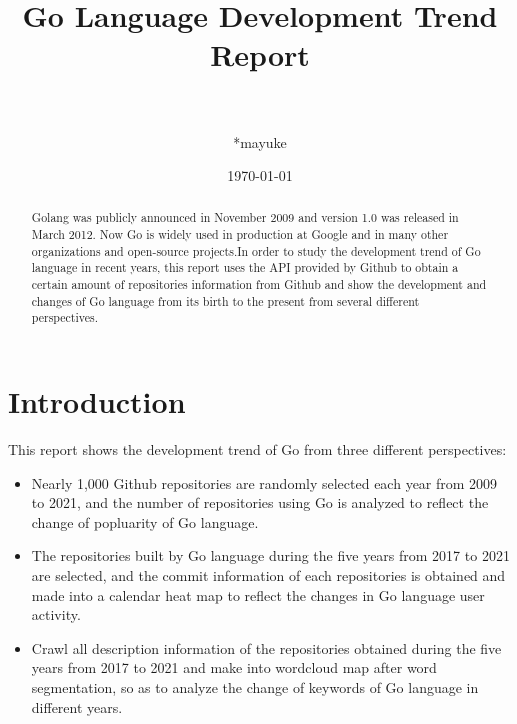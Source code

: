 \documentclass[11pt,onside,a4paper,fleqn]{report}
\title{\bf Go Language Development Trend Report}  %
\author{ \\ \\*mayuke\\}
\date{\today}                           %
\begin{document}
\maketitle                              %
\begin{abstract}

Golang was publicly announced in November 2009 and version 1.0 was released in March 2012. Now Go is widely used in production at Google and in many other organizations and open-source projects.In order to study the development trend of Go language in recent years, this report uses the API provided by Github to obtain a certain amount of repositories information from Github and show the development and changes of Go language from its birth to the present from several different perspectives.

\end{abstract}
\setcounter{page}{1}                    %
\chapter{Introduction}
This report shows the development trend of Go from three different perspectives:
\begin{itemize}
\item Nearly 1,000 Github repositories are randomly selected each year from 2009 to 2021, and the number of repositories using Go is analyzed to reflect the change of popluarity of Go language.

\item The repositories built by Go language during the five years from 2017 to 2021 are selected, and the commit information of each repositories is obtained and made into a calendar 
heat map to reflect the changes in Go language user activity.

\item Crawl all description information of the repositories obtained during the five years from 2017 to 2021 and make into wordcloud map after word segmentation, so as to analyze
 the change of keywords of Go language in different years.
\end{itemize}

 
\end{document}
